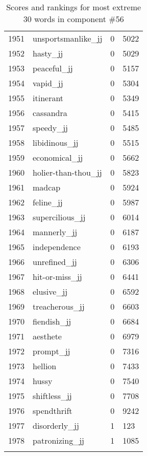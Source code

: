 \begin{longtable}[!htbp]{| rlr@{.}l |}
    1951 & unsportsmanlike\_jj & 0 & 5022 \\
    1952 & hasty\_jj & 0 & 5029 \\
    1953 & peaceful\_jj & 0 & 5157 \\
    1954 & vapid\_jj & 0 & 5304 \\
    1955 & itinerant & 0 & 5349 \\
    1956 & cassandra & 0 & 5415 \\
    1957 & speedy\_jj & 0 & 5485 \\
    1958 & libidinous\_jj & 0 & 5515 \\
    1959 & economical\_jj & 0 & 5662 \\
    1960 & holier-than-thou\_jj & 0 & 5823 \\
    1961 & madcap & 0 & 5924 \\
    1962 & feline\_jj & 0 & 5987 \\
    1963 & supercilious\_jj & 0 & 6014 \\
    1964 & mannerly\_jj & 0 & 6187 \\
    1965 & independence & 0 & 6193 \\
    1966 & unrefined\_jj & 0 & 6306 \\
    1967 & hit-or-miss\_jj & 0 & 6441 \\
    1968 & elusive\_jj & 0 & 6592 \\
    1969 & treacherous\_jj & 0 & 6603 \\
    1970 & fiendish\_jj & 0 & 6684 \\
    1971 & aesthete & 0 & 6979 \\
    1972 & prompt\_jj & 0 & 7316 \\
    1973 & hellion & 0 & 7433 \\
    1974 & hussy & 0 & 7540 \\
    1975 & shiftless\_jj & 0 & 7708 \\
    1976 & spendthrift & 0 & 9242 \\
    1977 & disorderly\_jj & 1 & 123 \\
    1978 & patronizing\_jj & 1 & 1085 \\
    \hline
    \caption{Scores and rankings for most extreme 30 words in component \#56} \\
\end{longtable}
